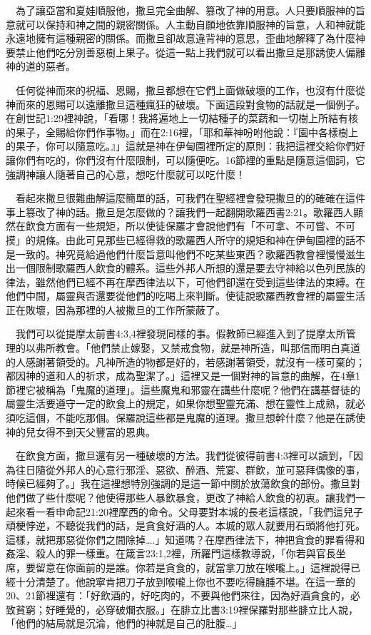 \documentclass{book}
\begin{document}
　為了讓亞當和夏娃順服他，撒旦完全曲解、篡改了神的用意。人只要順服神的旨意就可以保持和神之間的親密關係。人主動自願地依靠順服神的旨意，人和神就能永遠地擁有這種親密的關係。而撒旦卻故意違背神的意思，歪曲地解釋了為什麼神要禁止他們吃分別善惡樹上果子。從這一點上我們就可以看出撒旦是那誘使人偏離神的道的惡者。

　任何從神而來的祝福、恩賜，撒旦都想在它們上面做破壞的工作，也沒有什麼從神而來的恩賜可以遠離撒旦這種瘋狂的破壞。下面這段對食物的話就是一個例子。在創世記1:29裡神說，「看哪！我將遍地上一切結種子的菜蔬和一切樹上所結有核的果子，全賜給你們作事物。」而在2:16裡，「耶和華神吩咐他說：『園中各樣樹上的果子，你可以隨意吃。』」這就是神在伊甸園裡所定的原則：我把這裡交給你們好讓你們有吃的，你們沒有什麼限制，可以隨便吃。16節裡的重點是隨意這個詞，它強調神讓人隨著自己的心意，想吃什麼就可以吃什麼！

　看起來撒旦很難曲解這麼簡單的話，可我們在聖經裡會發現撒旦的的確確在這件事上篡改了神的話。撒旦是怎麼做的？讓我們一起翻開歌羅西書2:21。歌羅西人顯然在飲食方面有一些規矩，所以使徒保羅才會說他們有「不可拿、不可嘗、不可摸」的規條。由此可見那些已經得救的歌羅西人所守的規矩和神在伊甸園裡的話不是一致的。神究竟給過他們什麼旨意叫他們不吃某些東西？歌羅西教會裡慢慢滋生出一個限制歌羅西人飲食的體系。這些外邦人所想的還是要去守神給以色列民族的律法，雖然他們已經不再在摩西律法以下，可他們卻還在受到這些律法的束縛。在他們中間，屬靈與否還要從他們的吃喝上來判斷。使徒說歌羅西教會裡的屬靈生活正在敗壞，因為那裡的人被撒旦的工作所蒙蔽了。

　我們可以從提摩太前書4:3,4裡發現同樣的事。假教師已經進入到了提摩太所管理的以弗所教會。「他們禁止嫁娶，又禁戒食物，就是神所造，叫那信而明白真道的人感謝著領受的。凡神所造的物都是好的，若感謝著領受，就沒有一樣可棄的；都因神的道和人的祈求，成為聖潔了。」這裡又是一個對神的旨意的曲解，在4章1節裡它被稱為「鬼魔的道理」。這些魔鬼和邪靈在講些什麼呢？他們在講基督徒的屬靈生活要遵守一定的飲食上的規定，如果你想聖靈充滿、想在靈性上成熟，就必須吃這個，不能吃那個。保羅說這些都是鬼魔的道理。撒旦想幹什麼？他是在誘使神的兒女得不到天父豐富的恩典。

　在飲食方面，撒旦還有另一種破壞的方法。我們從彼得前書4:3裡可以讀到，「因為往日隨從外邦人的心意行邪淫、惡欲、醉酒、荒宴、群飲，並可惡拜偶像的事，時候已經夠了。」我在這裡想特別強調的是這一節中關於放蕩飲食的部份。撒旦對他們做了些什麼呢？他使得那些人暴飲暴食，更改了神給人飲食的初衷。讓我們一起來看一看申命記21:20裡摩西的命令。父母要對本城的長老這樣說，「我們這兒子頑梗悖逆，不聽從我們的話，是貪食好酒的人。本城的眾人就要用石頭將他打死。這樣，就把那惡從你們之間除掉….」知道嗎？在摩西律法下，神把貪食的罪看得和姦淫、殺人的罪一樣重。在箴言23:1,2裡，所羅門這樣教導說，「你若與官長坐席，要留意在你面前的是誰。你若是貪食的，就當拿刀放在喉嚨上。」這裡說得已經十分清楚了。他說寧肯把刀子放到喉嚨上你也不要吃得臃腫不堪。在這一章的20、21節裡還有：「好飲酒的，好吃肉的，不要與他們來往，因為好酒貪食的，必致貧窮；好睡覺的，必穿破爛衣服。」在腓立比書3:19裡保羅對那些腓立比人說，「他們的結局就是沉淪，他們的神就是自己的肚腹…」
\end{document}
